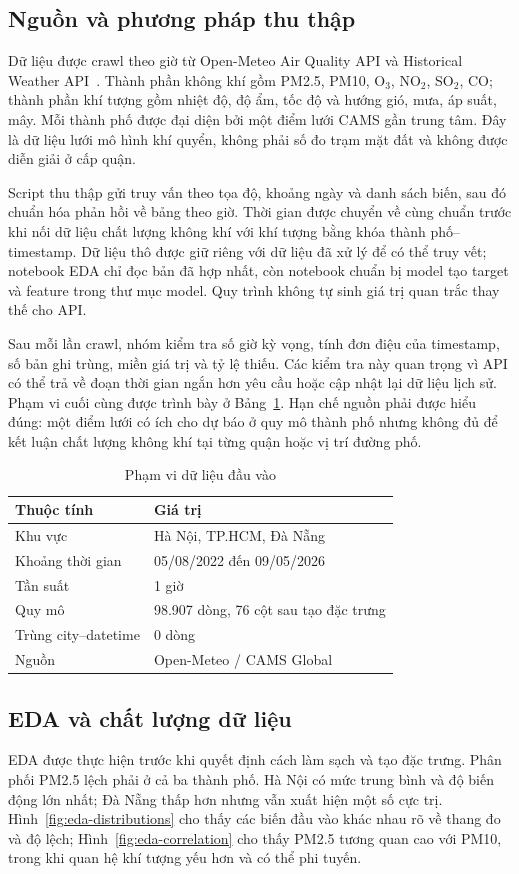 \documentclass[11pt,a4paper]{article}
\begin{document}
\subsection{Nguồn và phương pháp thu thập}
Dữ liệu được crawl theo giờ từ Open-Meteo Air Quality API và Historical Weather API~\cite{openmeteo}. Thành phần không khí gồm PM2.5, PM10, O$_3$, NO$_2$, SO$_2$, CO; thành phần khí tượng gồm nhiệt độ, độ ẩm, tốc độ và hướng gió, mưa, áp suất, mây. Mỗi thành phố được đại diện bởi một điểm lưới CAMS gần trung tâm. Đây là dữ liệu lưới mô hình khí quyển, không phải số đo trạm mặt đất và không được diễn giải ở cấp quận.

Script thu thập gửi truy vấn theo tọa độ, khoảng ngày và danh sách biến, sau đó chuẩn hóa phản hồi về bảng theo giờ. Thời gian được chuyển về cùng chuẩn trước khi nối dữ liệu chất lượng không khí với khí tượng bằng khóa thành phố--timestamp. Dữ liệu thô được giữ riêng với dữ liệu đã xử lý để có thể truy vết; notebook EDA chỉ đọc bản đã hợp nhất, còn notebook chuẩn bị model tạo target và feature trong thư mục model. Quy trình không tự sinh giá trị quan trắc thay thế cho API.

Sau mỗi lần crawl, nhóm kiểm tra số giờ kỳ vọng, tính đơn điệu của timestamp, số bản ghi trùng, miền giá trị và tỷ lệ thiếu. Các kiểm tra này quan trọng vì API có thể trả về đoạn thời gian ngắn hơn yêu cầu hoặc cập nhật lại dữ liệu lịch sử. Phạm vi cuối cùng được trình bày ở Bảng~\ref{tab:scope}. Hạn chế nguồn phải được hiểu đúng: một điểm lưới có ích cho dự báo ở quy mô thành phố nhưng không đủ để kết luận chất lượng không khí tại từng quận hoặc vị trí đường phố.

\begin{table}[H]
\centering\small
\caption{Phạm vi dữ liệu đầu vào}
\label{tab:scope}
\begin{tabular}{ll}
\toprule
Thuộc tính & Giá trị\\
\midrule
Khu vực & Hà Nội, TP.HCM, Đà Nẵng\\
Khoảng thời gian & 05/08/2022 đến 09/05/2026\\
Tần suất & 1 giờ\\
Quy mô & 98.907 dòng, 76 cột sau tạo đặc trưng\\
Trùng city--datetime & 0 dòng\\
Nguồn & Open-Meteo / CAMS Global\\
\bottomrule
\end{tabular}
\end{table}

\subsection{EDA và chất lượng dữ liệu}
EDA được thực hiện trước khi quyết định cách làm sạch và tạo đặc trưng. Phân phối PM2.5 lệch phải ở cả ba thành phố. Hà Nội có mức trung bình và độ biến động lớn nhất; Đà Nẵng thấp hơn nhưng vẫn xuất hiện một số cực trị. Hình~\ref{fig:eda-distributions} cho thấy các biến đầu vào khác nhau rõ về thang đo và độ lệch; Hình~\ref{fig:eda-correlation} cho thấy PM2.5 tương quan cao với PM10, trong khi quan hệ khí tượng yếu hơn và có thể phi tuyến.
\end{document}
